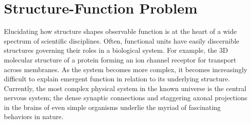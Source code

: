 %

\section{Structure-Function Problem}
Elucidating how structure shapes observable function is at the heart of a wide spectrum of scientific disciplines. Often, functional units have easily discernible structures governing their roles in a biological system. For example, the 3D molecular structure of a protein forming an ion channel receptor for transport across membranes. As the system becomes more complex, it becomes increasingly difficult to explain emergent function in relation to its underlying structure. Currently, the most complex physical system in the known universe is the central nervous system; the dense synaptic connections and staggering axonal projections in the brains of even simple organisms underlie the myriad of fascinating behaviors in nature.

